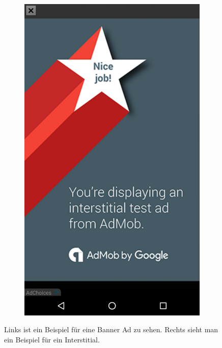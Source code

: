 \documentclass[FIPLY_base.tex]{subfiles}
\begin{document}
\begin{figure}[h]
\begin{subfigure}[b]{0.3\textwidth}
	\end{subfigure}
	\hfil
	\begin{subfigure}[b]{0.3\textwidth}
	\includegraphics[scale=0.15]{img/adsInterstitial}
	\end{subfigure}
	\caption{Links ist ein Beispiel für eine Banner Ad zu sehen. \newline Rechts sieht man ein Beispiel für ein Interstitial.}
\end{figure}
\end{document}
